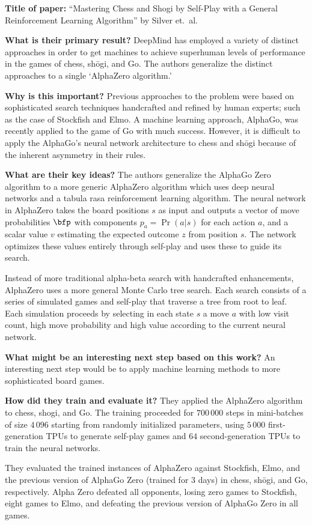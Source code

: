 \noindent \textbf{Title of paper:} ``Mastering Chess and Shogi by Self-Play with a General Reinforcement Learning Algorithm'' by Silver et.\ al.

\noindent\textbf{What is their primary result?} DeepMind has employed a variety
of distinct approaches in order to get machines to achieve superhuman levels of
performance in the games of chess, shōgi, and Go. The authors generalize the
distinct approaches to a single `AlphaZero algorithm.'

\noindent\textbf{Why is this important?} Previous approaches to the problem were
based on sophisticated search techniques handcrafted and refined by human
experts; such as the case of Stockfish and Elmo. A machine learning approach,
AlphaGo, was recently applied to the game of Go with much success. However, it
is difficult to apply the AlphaGo's neural network architecture to chess and
shōgi because of the inherent asymmetry in their rules.

\noindent\textbf{What are their key ideas?} The authors generalize the AlphaGo
Zero algorithm to a more generic AlphaZero algorithm which uses deep neural
networks and a tabula rasa reinforcement learning algorithm. The neural network
in AlphaZero takes the board positions $s$ as input and outputs a vector of move
probabilities $\bfp$ with components $p_a=\Pr(a|s)$ for each action $a$, and a
scalar value $v$ estimating the expected outcome $z$ from position $s$. The
network optimizes these values entirely through self-play and uses these to
guide its search.

Instead of more traditional alpha-beta search with handcrafted enhancements,
AlphaZero uses a more general Monte Carlo tree search. Each search consists of a
series of simulated games and self-play that traverse a tree from root to leaf.
Each simulation proceeds by selecting in each state $s$ a move $a$ with low
visit count, high move probability and high value according to the current
neural network.

\noindent\textbf{What might be an interesting next step based on this work?} An
interesting next step would be to apply machine learning methods to more
sophisticated board games.


\noindent\textbf{How did they train and evaluate it?} They applied the AlphaZero
algorithm to chess, shogi, and Go. The training proceeded for $700\,000$ steps
in mini-batches of size $4\,096$ starting from randomly initialized parameters,
using $5\,000$ first-generation TPUs to generate self-play games and $64$
second-generation TPUs to train the neural networks.

They evaluated the trained instances of AlphaZero against Stockfish, Elmo, and
the previous version of AlphaGo Zero (trained for $3$ days) in chess, shōgi, and
Go, respectively. Alpha Zero defeated all opponents, losing zero games to
Stockfish, eight games to Elmo, and defeating the previous version of AlphaGo
Zero in all games.


